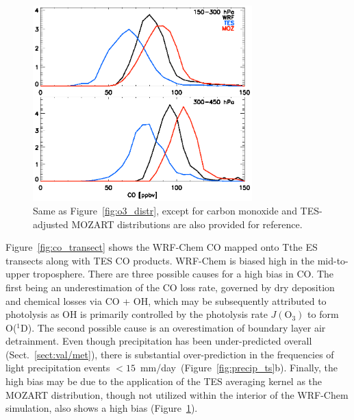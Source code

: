  \begin{figure}
 \noindent\includegraphics[width=20pc]{figures/co/co_teswrfhist.eps} %
 \caption{Same as Figure~\ref{fig:o3_distr}, except for carbon monoxide and TES-adjusted
MOZART distributions are also provided for reference.}
 \label{fig:co_distr}
 \end{figure}

Figure~\ref{fig:co_transect} shows the WRF-Chem
CO mapped onto Tthe ES transects along with TES CO products. WRF-Chem is
biased high in the mid-to-upper troposphere. There are three possible causes for a high
bias in CO. The first being an underestimation of the CO loss rate, governed by dry deposition
and chemical losses via CO + OH, which may be subsequently attributed to photolysis
as OH is primarily controlled by the photolysis rate $J(\mathrm{O}_3)$ to form O($^1$D). The second
possible cause is an overestimation of boundary layer air detrainment. Even though
precipitation has been under-predicted overall (Sect.~\ref{sect:val/met}), there is
substantial over-prediction in the frequencies of light precipitation events
$<15$~mm/day~(Figure~\ref{fig:precip_ts}b). Finally, the high bias may be due to the
application of the TES averaging kernel as the MOZART distribution, though not utilized within
the interior of the WRF-Chem simulation, also shows a high bias (Figure~\ref{fig:co_distr}).

